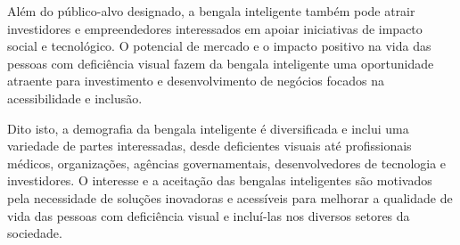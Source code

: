 Além do público-alvo designado, a bengala inteligente também pode atrair investidores e empreendedores interessados em apoiar iniciativas de impacto social e tecnológico. O potencial de mercado e o impacto positivo na vida das pessoas com deficiência visual fazem da bengala inteligente uma oportunidade atraente para investimento e desenvolvimento de negócios focados na acessibilidade e inclusão.

Dito isto, a demografia da bengala inteligente é diversificada e inclui uma variedade de partes interessadas, desde deficientes visuais até profissionais médicos, organizações, agências governamentais, desenvolvedores de tecnologia e investidores. O interesse e a aceitação das bengalas inteligentes são motivados pela necessidade de soluções inovadoras e acessíveis para melhorar a qualidade de vida das pessoas com deficiência visual e incluí-las nos diversos setores da sociedade.



